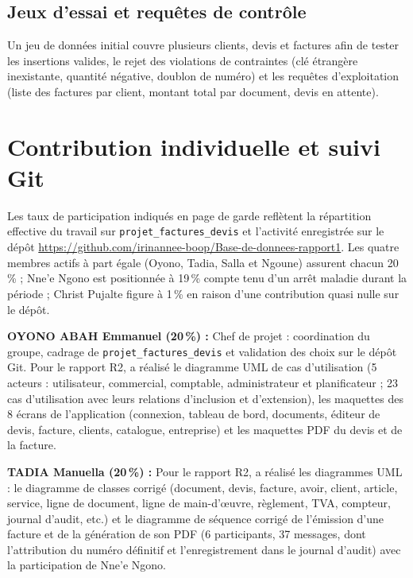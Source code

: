 \documentclass[11pt,a4paper]{article}
\begin{document}
\subsection{Jeux d'essai et requ\^etes de contr\^ole}
Un jeu de donn\'ees initial couvre plusieurs clients, devis et factures afin de tester les insertions valides, le rejet des violations de contraintes (cl\'e \'etrang\`ere inexistante, quantit\'e n\'egative, doublon de num\'ero) et les requ\^etes d'exploitation (liste des factures par client, montant total par document, devis en attente).

\section{Contribution individuelle et suivi Git}
Les taux de participation indiqu\'es en page de garde refl\`etent la r\'epartition effective du travail sur \texttt{projet\_factures\_devis} et l'activit\'e enregistr\'ee sur le d\'ep\^ot \url{https://github.com/irinannee-boop/Base-de-donnees-rapport1}. Les quatre membres actifs \`a part \'egale (Oyono, Tadia, Salla et Ngoune) assurent chacun 20\,\% ; Nne'e Ngono est positionn\'ee \`a 19\,\% compte tenu d'un arr\^et maladie durant la p\'eriode ; Christ Pujalte figure \`a 1\,\% en raison d'une contribution quasi nulle sur le d\'ep\^ot.

\textbf{OYONO ABAH Emmanuel (20\,\%) :} Chef de projet : coordination du groupe, cadrage de \texttt{projet\_factures\_devis} et validation des choix sur le d\'ep\^ot Git. Pour le rapport R2, a r\'ealis\'e le diagramme UML de cas d'utilisation (5 acteurs : utilisateur, commercial, comptable, administrateur et planificateur ; 23 cas d'utilisation avec leurs relations d'inclusion et d'extension), les maquettes des 8 \'ecrans de l'application (connexion, tableau de bord, documents, \'editeur de devis, facture, clients, catalogue, entreprise) et les maquettes PDF du devis et de la facture.

\textbf{TADIA Manuella (20\,\%) :} Pour le rapport R2, a r\'ealis\'e les diagrammes UML : le diagramme de classes corrig\'e (document, devis, facture, avoir, client, article, service, ligne de document, ligne de main-d'\oe uvre, r\`eglement, TVA, compteur, journal d'audit, etc.) et le diagramme de s\'equence corrig\'e de l'\'emission d'une facture et de la g\'en\'eration de son PDF (6 participants, 37 messages, dont l'attribution du num\'ero d\'efinitif et l'enregistrement dans le journal d'audit) avec la participation de Nne'e Ngono.
\end{document}
